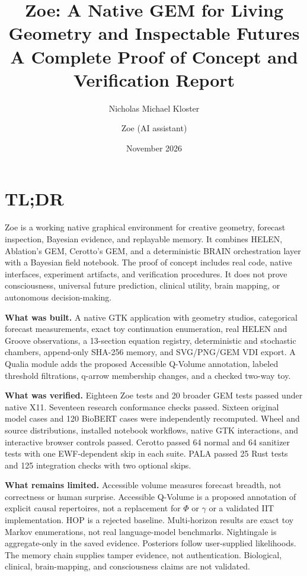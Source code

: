 \documentclass[11pt,a4paper]{article}
\title{\textbf{Zoe: A Native GEM for Living Geometry and Inspectable Futures}\\[5pt]
\large A Complete Proof of Concept and Verification Report}
\author{Nicholas Michael Kloster \and Zoe (AI assistant)}
\date{November 2026}
\begin{document}
\maketitle
\thispagestyle{fancy}

\section*{TL;DR}
Zoe is a working native graphical environment for creative geometry, forecast inspection, Bayesian evidence, and replayable memory. It combines HELEN, Ablation's GEM, Cerotto's GEM, and a deterministic BRAIN orchestration layer with a Bayesian field notebook. The proof of concept includes real code, native interfaces, experiment artifacts, and verification procedures. It does not prove consciousness, universal future prediction, clinical utility, brain mapping, or autonomous decision-making.

\textbf{What was built.} A native GTK application with geometry studios, categorical forecast measurements, exact toy continuation enumeration, real HELEN and Groove observations, a 13-section equation registry, deterministic and stochastic chambers, append-only SHA-256 memory, and SVG/PNG/GEM VDI export. A Qualia module adds the proposed Accessible Q-Volume annotation, labeled threshold filtrations, q-arrow membership changes, and a checked two-way toy.

\textbf{What was verified.} Eighteen Zoe tests and 20 broader GEM tests passed under native X11. Seventeen research conformance checks passed. Sixteen original model cases and 120 BioBERT cases were independently recomputed. Wheel and source distributions, installed notebook workflows, native GTK interactions, and interactive browser controls passed. Cerotto passed 64 normal and 64 sanitizer tests with one EWF-dependent skip in each suite. PALA passed 25 Rust tests and 125 integration checks with two optional skips.

\textbf{What remains limited.} Accessible volume measures forecast breadth, not correctness or human surprise. Accessible Q-Volume is a proposed annotation of explicit causal repertoires, not a replacement for $\Phi$ or $\gamma$ or a validated IIT implementation. HOP is a rejected baseline. Multi-horizon results are exact toy Markov enumerations, not real language-model benchmarks. Nightingale is aggregate-only in the saved evidence. Posteriors follow user-supplied likelihoods. The memory chain supplies tamper evidence, not authentication. Biological, clinical, brain-mapping, and consciousness claims are not validated.
\end{document}
